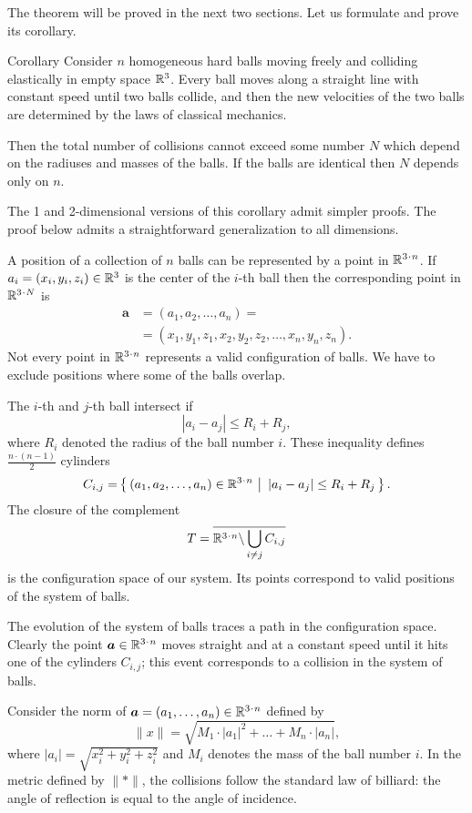 The theorem will be proved in the next two sections.
Let us formulate and prove its corollary.

\begin{thm}{Corollary}\label{cor:balls}
Consider $n$ homogeneous hard balls
moving freely and colliding
elastically in empty space $\mathbb{R}^3$. 
Every ball moves
along a straight line with constant speed until two balls collide, and then
the new velocities of the two balls are determined by the
laws of classical mechanics.

Then the total number of collisions cannot exceed some number $N$ which depend on the radiuses and masses of the balls.
If the balls are identical then $N$ depends only on $n$.
\end{thm}

The 1 and 2-dimensional versions of this corollary 
admit simpler proofs.
The proof below admits a straightforward generalization to all dimensions.

A position of a collection of $n$ balls can be represented by a point in $\RR^{3\cdot n}$.
If $a_i=(x_i,y_i,z_i) \in \RR^3$ is the center of the $i$-th ball
then
the corresponding point in $\RR^{3\cdot N}$ is
\begin{align*}
\bm{a}&=(a_1, a_2 , \dots , a_n ) =
\\
&=(x_1, y_1 , z_1 , x_2 , y_2 , z_2 , \dots , x_n , y_n , z_n).
\end{align*}
Not every point in $\RR^{3\cdot n}$ represents a valid configuration of balls. 
We have to exclude positions where some of the balls overlap. 

The $i$-th and $j$-th ball intersect if 
$$|a_i - a_j | \le R_i+R_j,$$
where $R_i$ denoted the radius of the ball number $i$.
These inequality defines $\tfrac{n\cdot(n-1)}{2}$ cylinders 
\[C_{i,j}=\set{(a_1, a_2 , \dots , a_n )\in\RR^{3\cdot n}} {|a_i - a_j | \le R_i+R_j}.\] 
The closure of the complement
\[T=\overline{\RR^{3\cdot n}\backslash \bigcup_{i\ne j} C_{i,j}}\] 
is the configuration space of our system. 
Its points correspond
to valid positions of the system of balls.

The evolution of the system
of balls traces a path in the configuration space. 
Clearly
the point $\bm{a}\in\RR^{3\cdot n}$ moves straight and at a
constant speed until it hits one of the cylinders $C_{i,j}$; this event corresponds
to a collision in the system of balls.

Consider the norm of $\bm{a}=(a_1,\dots,a_n)\in \RR^{3\cdot n}$ defined by
\[\lVert x\rVert=\sqrt{M_1\cdot|a_1|^2+\dots+M_n\cdot |a_n|},\]
where $|a_i|=\sqrt{x_i^2+y_i^2+z_i^2}$ 
and $M_i$ denotes the mass of the ball number $i$.
In the metric defined by $\lVert {*}\rVert$,
the collisions follow the
standard law of billiard: 
the angle of reflection is equal to the angle
of incidence. 

